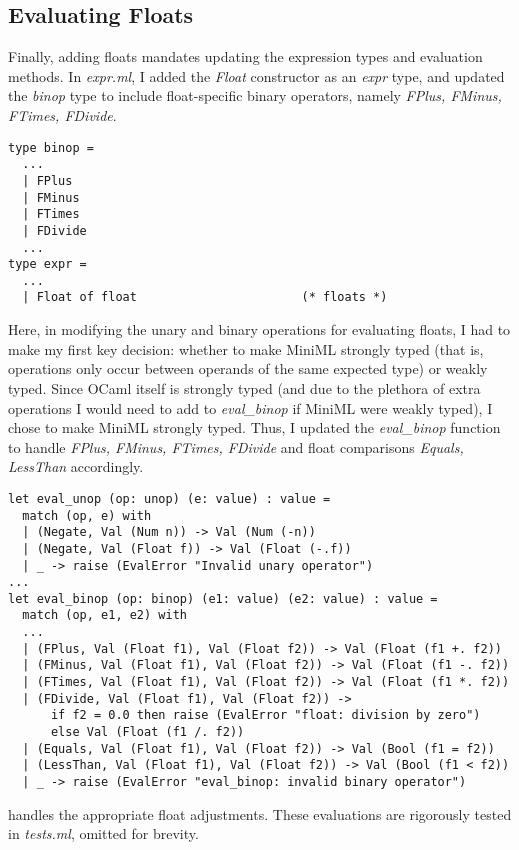 \documentclass[12pt]{article}
\begin{document}
\subsection*{Evaluating Floats}
Finally, adding floats mandates updating the expression types and evaluation methods. In \textit{expr.ml}, I added the \textit{Float} constructor as an \textit{expr} type, and updated the \textit{binop} type to include float-specific binary operators, namely \textit{FPlus, FMinus, FTimes, FDivide}.
\begin{verbatim}
type binop =
  ...
  | FPlus
  | FMinus
  | FTimes
  | FDivide
  ...
type expr =
  ...
  | Float of float                       (* floats *)
\end{verbatim}

Here, in modifying the unary and binary operations for evaluating floats, I had to make my first key decision: whether to make MiniML strongly typed (that is, operations only occur between operands of the same expected type) or weakly typed. Since OCaml itself is strongly typed (and due to the plethora of extra operations I would need to add to \textit{eval\_binop} if MiniML were weakly typed), I chose to make MiniML strongly typed.
Thus, I updated the \textit{eval\_binop} function to handle \textit{FPlus, FMinus, FTimes, FDivide} and float comparisons \textit{Equals, LessThan} accordingly. 

\begin{verbatim}
let eval_unop (op: unop) (e: value) : value =
  match (op, e) with
  | (Negate, Val (Num n)) -> Val (Num (-n))
  | (Negate, Val (Float f)) -> Val (Float (-.f))
  | _ -> raise (EvalError "Invalid unary operator")
...
let eval_binop (op: binop) (e1: value) (e2: value) : value =
  match (op, e1, e2) with
  ...
  | (FPlus, Val (Float f1), Val (Float f2)) -> Val (Float (f1 +. f2))
  | (FMinus, Val (Float f1), Val (Float f2)) -> Val (Float (f1 -. f2))
  | (FTimes, Val (Float f1), Val (Float f2)) -> Val (Float (f1 *. f2))
  | (FDivide, Val (Float f1), Val (Float f2)) ->
      if f2 = 0.0 then raise (EvalError "float: division by zero")
      else Val (Float (f1 /. f2))
  | (Equals, Val (Float f1), Val (Float f2)) -> Val (Bool (f1 = f2))
  | (LessThan, Val (Float f1), Val (Float f2)) -> Val (Bool (f1 < f2))
  | _ -> raise (EvalError "eval_binop: invalid binary operator")
\end{verbatim}
handles the appropriate float adjustments.
These evaluations are rigorously tested in \textit{tests.ml}, omitted for brevity.
\end{document}
